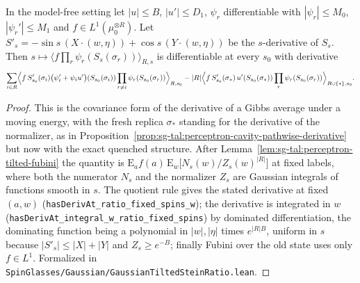 \begin{theorem}\label{thm:sg-tal:perceptron-tilted-rotation}
  \leanok
In the model-free setting let $|u|\le B$, $|u'|\le D_1$, $\psi_r$ differentiable with $|\psi_r|\le M_0$, $|\psi_r'|\le M_1$ and $f\in L^1(\mu_0^{\otimes R})$. Let
$S'_s=-\sin s\,(X\cdot(w,\eta))+\cos s\,(Y\cdot(w,\eta))$ be the $s$-derivative of $S_s$. Then
$s\mapsto\bigl\langle f\prod_r\psi_r(S_s(\sigma_r))\bigr\rangle_{R,s}$ is differentiable at every $s_0$ with derivative
\[
 \sum_{i\in R}\Bigl\langle f\,S'_{s_0}(\sigma_i)\bigl(\psi_i'+\psi_iu'\bigr)(S_{s_0}(\sigma_i))\prod_{r\ne i}\psi_r(S_{s_0}(\sigma_r))\Bigr\rangle_{R,s_0}
 -|R|\Bigl\langle f\,S'_{s_0}(\sigma_*)\,u'(S_{s_0}(\sigma_*))\prod_r\psi_r(S_{s_0}(\sigma_r))\Bigr\rangle_{R\cup\{*\},s_0}.
\]
\end{theorem}
\begin{proof}
  \leanok
This is the covariance form of the derivative of a Gibbs average under a moving energy, with the fresh replica $\sigma_*$ standing for the derivative of the normalizer, as in Proposition~\ref{prop:sg-tal:perceptron-cavity-pathwise-derivative}
but now with the exact quenched structure. After Lemma~\ref{lem:sg-tal:perceptron-tilted-fubini} the quantity is $\mathrm E_a f(a)\,\mathrm E_w\bigl[N_s(w)/Z_s(w)^{|R|}\bigr]$ at fixed labels, where both the numerator $N_s$ and the normalizer $Z_s$ are Gaussian integrals of functions smooth in $s$.
The quotient rule gives the stated derivative at fixed $(a,w)$ (\texttt{hasDerivAt\_ratio\_fixed\_spins\_w}); the derivative is integrated in $w$ (\texttt{hasDerivAt\_integral\_w\_ratio\_fixed\_spins}) by dominated differentiation, the dominating function being
a polynomial in $|w|,|\eta|$ times $e^{|R|B}$, uniform in $s$ because $|S'_s|\le|X|+|Y|$ and $Z_s\ge e^{-B}$; finally Fubini over the old state uses only $f\in L^1$.
Formalized in \texttt{SpinGlasses/Gaussian/GaussianTiltedSteinRatio.lean}.
\end{proof}

